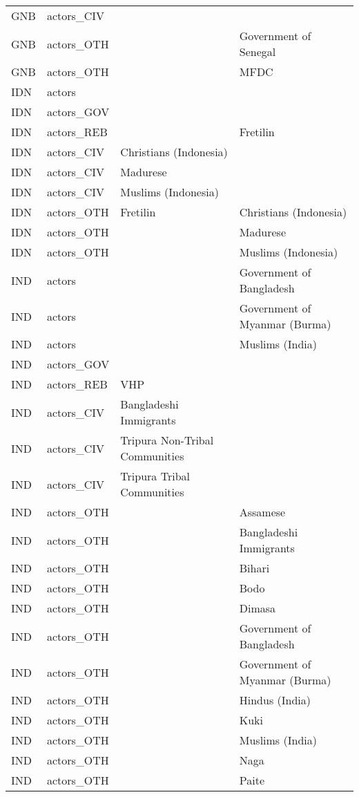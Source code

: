 \begin{table}[ht]
\begin{tabular}{llll}
  GNB & actors\_CIV &  &  \\ 
  GNB & actors\_OTH &  & Government of Senegal \\ 
  GNB & actors\_OTH &  & MFDC \\ 
  IDN & actors &  &  \\ 
  IDN & actors\_GOV &  &  \\ 
  IDN & actors\_REB &  & Fretilin \\ 
  IDN & actors\_CIV & Christians (Indonesia) &  \\ 
  IDN & actors\_CIV & Madurese &  \\ 
  IDN & actors\_CIV & Muslims (Indonesia) &  \\ 
  IDN & actors\_OTH & Fretilin & Christians (Indonesia) \\ 
  IDN & actors\_OTH &  & Madurese \\ 
  IDN & actors\_OTH &  & Muslims (Indonesia) \\ 
  IND & actors &  & Government of Bangladesh \\ 
  IND & actors &  & Government of Myanmar (Burma) \\ 
  IND & actors &  & Muslims (India) \\ 
  IND & actors\_GOV &  &  \\ 
  IND & actors\_REB & VHP &  \\ 
  IND & actors\_CIV & Bangladeshi Immigrants &  \\ 
  IND & actors\_CIV & Tripura Non-Tribal Communities &  \\ 
  IND & actors\_CIV & Tripura Tribal Communities &  \\ 
  IND & actors\_OTH &  & Assamese \\ 
  IND & actors\_OTH &  & Bangladeshi Immigrants \\ 
  IND & actors\_OTH &  & Bihari \\ 
  IND & actors\_OTH &  & Bodo \\ 
  IND & actors\_OTH &  & Dimasa \\ 
  IND & actors\_OTH &  & Government of Bangladesh \\ 
  IND & actors\_OTH &  & Government of Myanmar (Burma) \\ 
  IND & actors\_OTH &  & Hindus (India) \\ 
  IND & actors\_OTH &  & Kuki \\ 
  IND & actors\_OTH &  & Muslims (India) \\ 
  IND & actors\_OTH &  & Naga \\ 
  IND & actors\_OTH &  & Paite \\ 

\end{tabular}
\end{table}
